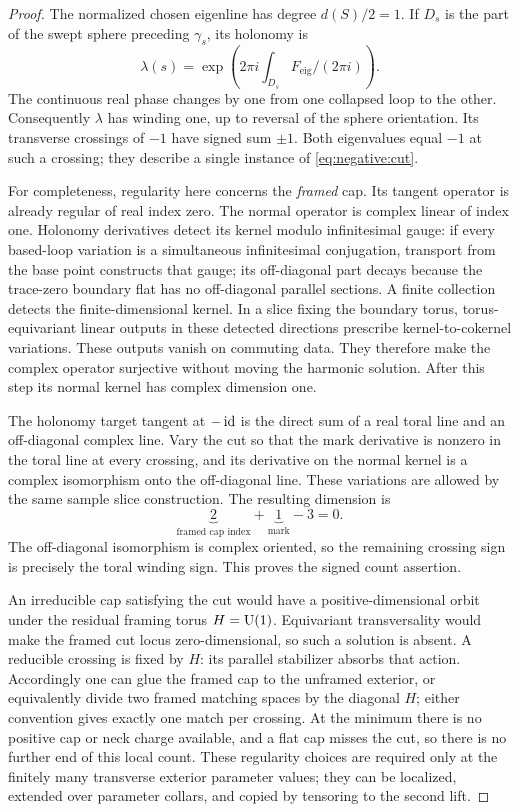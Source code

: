 \begin{proof}
The normalized chosen eigenline has degree $d(S)/2=1$.  If $D_s$ is
the part of the swept sphere preceding $\gamma_s$, its holonomy is
\[
 \lambda(s)=\exp\left(2\pi i\int_{D_s}F_{\mathrm{eig}}/(2\pi i)\right).
\]
The continuous real phase changes by one from one collapsed loop to
the other.  Consequently $\lambda$ has winding one, up to reversal of
the sphere orientation.  Its transverse crossings of $-1$ have signed
sum $\pm1$.  Both eigenvalues equal $-1$ at such a crossing; they
describe a single instance of \eqref{eq:negative:cut}.

For completeness, regularity here concerns the \emph{framed} cap.
Its tangent operator is already regular of real index zero.  The
normal operator is complex linear of index one.  Holonomy derivatives
detect its kernel modulo infinitesimal gauge: if every based-loop
variation is a simultaneous infinitesimal conjugation, transport from
the base point constructs that gauge; its off-diagonal part decays
because the trace-zero boundary flat has no off-diagonal parallel
sections.  A finite collection detects the finite-dimensional kernel.
In a slice fixing the boundary torus, torus-equivariant linear outputs
in these detected directions prescribe kernel-to-cokernel variations.
These outputs vanish on commuting data.  They therefore make the
complex operator surjective without moving the harmonic solution.
After this step its normal kernel has complex dimension one.

The holonomy target tangent at $-\operatorname{id}$ is the direct sum of a real toral
line and an off-diagonal complex line.  Vary the cut so that the mark
derivative is nonzero in the toral line at every crossing, and its
derivative on the normal kernel is a complex isomorphism onto the
off-diagonal line.  These variations are allowed by the same sample
slice construction.  The resulting dimension is
\begin{equation}\label{eq:negative:framed-cut}
 \underbrace{2}_{\text{framed cap index}}
 +\underbrace{1}_{\text{mark}}-3=0.
\end{equation}
The off-diagonal isomorphism is complex oriented, so the remaining
crossing sign is precisely the toral winding sign.  This proves the
signed count assertion.

An irreducible cap satisfying the cut would have a positive-dimensional
orbit under the residual framing torus $H=\operatorname{U}(1)$.  Equivariant
transversality would make the framed cut locus zero-dimensional, so
such a solution is absent.  A reducible crossing is fixed by $H$:
its parallel stabilizer absorbs that action.  Accordingly one can
glue the framed cap to the unframed exterior, or equivalently divide
two framed matching spaces by the diagonal $H$; either convention
gives exactly one match per crossing.  At the minimum there is no
positive cap or neck charge available, and a flat cap misses the cut,
so there is no further end of this local count.  These regularity
choices are required only at the finitely many transverse exterior
parameter values; they can be localized, extended over parameter
collars, and copied by tensoring to the second lift.
\end{proof}

